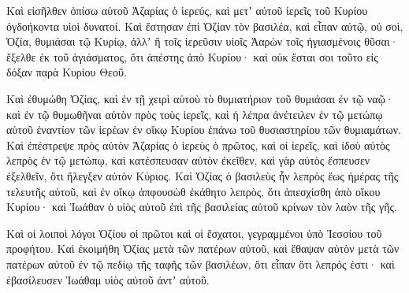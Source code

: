 {Καὶ εἰσῆλθεν ὀπίσω αὐτοῦ Ἀζαρίας ὁ ἱερεύς, καὶ μετʼ αὐτοῦ ἱερεῖς τοῦ Κυρίου ὀγδοήκοντα υἱοὶ δυνατοί.
Καὶ ἔστησαν ἐπὶ Ὀζίαν τὸν βασιλέα, καὶ εἶπαν αὐτῷ, οὐ σοὶ, Ὀζία, θυμιάσαι τῷ Κυρίῳ, ἀλλʼ ἢ τοῖς ἱερεῦσιν υἱοῖς Ἀαρὼν τοῖς ἡγιασμένοις θῦσαι· ἔξελθε ἐκ τοῦ ἁγιάσματος, ὅτι ἀπέστης ἀπὸ Κυρίου· καὶ οὐκ ἔσται σοι τοῦτο εἰς δόξαν παρὰ Κυρίου Θεοῦ.
\par }{\PP {}Καὶ ἐθυμώθη Ὀζίας, καὶ ἐν τῇ χειρὶ αὐτοὺ τὸ θυμιατήριον τοῦ θυμιάσαι ἐν τῷ ναῷ· καὶ ἐν τῷ θυμωθῆναι αὐτὸν πρὸς τοὺς ἱερεῖς, καὶ ἡ λέπρα ἀνέτειλεν ἐν τῷ μετώπῳ αὐτοῦ ἐναντίον τῶν ἱερέων ἐν οἴκῳ Κυρίου ἐπάνω τοῦ θυσιαστηρίου τῶν θυμιαμάτων.
Καὶ ἐπέστρεψε πρὸς αὐτὸν Ἀζαρίας ὁ ἱερεὺς ὁ πρῶτος, καὶ οἱ ἱερεῖς, καὶ ἰδοὺ αὐτὸς λεπρὸς ἐν τῷ μετώπῳ, καὶ κατέσπευσαν αὐτὸν ἐκεῖθεν, καὶ γὰρ αὐτὸς ἔσπευσεν ἐξελθεῖν, ὅτι ἤλεγξεν αὐτὸν Κύριος.
Καὶ Ὀζίας ὁ βασιλεὺς ἦν λεπρὸς ἕως ἡμέρας τῆς τελευτῆς αὐτοῦ, καὶ ἐν οἴκῳ ἀπφουσὼθ ἐκάθητο λεπρὸς, ὅτι ἀπεσχίσθη ἀπὸ οἴκου Κυρίου· καὶ Ἰωάθαν ὁ υἱὸς αὐτοῦ ἐπὶ τῆς βασιλείας αὐτοῦ κρίνων τὸν λαὸν τῆς γῆς.
\par }{\PP {}Καὶ οἱ λοιποὶ λόγοι Ὀζίου οἱ πρῶτοι καὶ οἱ ἔσχατοι, γεγραμμένοι ὑπὸ Ἰεσσίου τοῦ προφήτου.
Καὶ ἐκοιμήθη Ὀζίας μετὰ τῶν πατέρων αὐτοῦ, καὶ ἔθαψαν αὐτὸν μετὰ τῶν πατέρων αὐτοῦ ἐν τῷ πεδίῳ τῆς ταφῆς τῶν βασιλέων, ὅτι εἶπαν ὅτι λεπρός ἐστι· καὶ ἐβασίλευσεν Ἰωάθαμ υἱὸς αὐτοῦ ἀντʼ αὐτοῦ.

\par }
